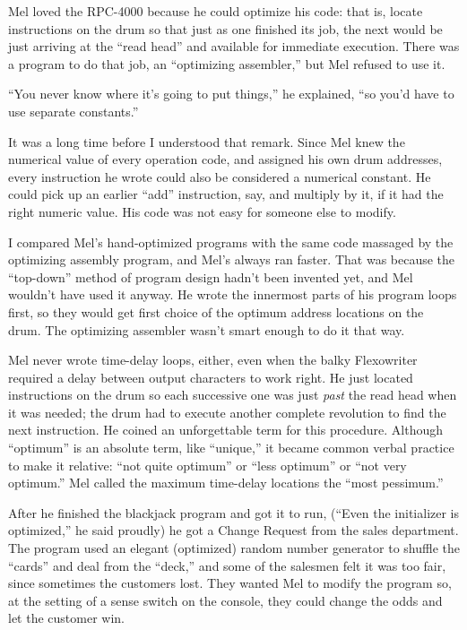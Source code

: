 \documentclass[12pt]{article}
\begin{document}
\bigskip
\noindent
Mel loved the RPC-4000 because he could optimize his code:
that is, locate instructions on the drum so that just as one
finished its job, the next would be just arriving at the
``read head'' and available for immediate execution. There
was a program to do that job, an ``optimizing assembler,'' but
Mel refused to use it.

\bigskip
\noindent
``You never know where it's going to put things,'' he
explained, ``so you'd have to use separate constants.''

\bigskip
\noindent
It was a long time before I understood that remark. Since
Mel knew the numerical value of every operation code, and
assigned his own drum addresses, every instruction he wrote
could also be considered a numerical constant. He could
pick up an earlier ``add'' instruction, say, and multiply by
it, if it had the right numeric value. His code was not
easy for someone else to modify.

\bigskip
\noindent
I compared Mel's hand-optimized programs with the same code
massaged by the optimizing assembly program, and Mel's
always ran faster. That was because the ``top-down'' method
of program design hadn't been invented yet, and Mel wouldn't
have used it anyway. He wrote the innermost parts of his
program loops first, so they would get first choice of the
optimum address locations on the drum. The optimizing
assembler wasn't smart enough to do it that way.

\bigskip
\noindent
Mel never wrote time-delay loops, either, even when the
balky Flexowriter required a delay between output characters
to work right. He just located instructions on the drum so
each successive one was just {\it past} the read head when it
was needed; the drum had to execute another complete
revolution to find the next instruction. He coined an
unforgettable term for this procedure. Although ``optimum''
is an absolute term, like ``unique,'' it became common verbal
practice to make it relative: ``not quite optimum'' or ``less
optimum'' or ``not very optimum.'' Mel called the maximum
time-delay locations the ``most pessimum.''

\bigskip
\noindent
After he finished the blackjack program and got it to run,
(``Even the initializer is optimized,'' he said proudly) he
got a Change Request from the sales department. The program
used an elegant (optimized) random number generator to
shuffle the ``cards'' and deal from the ``deck,'' and some of
the salesmen felt it was too fair, since sometimes the
customers lost. They wanted Mel to modify the program so,
at the setting of a sense switch on the console, they could
change the odds and let the customer win.
\end{document}
